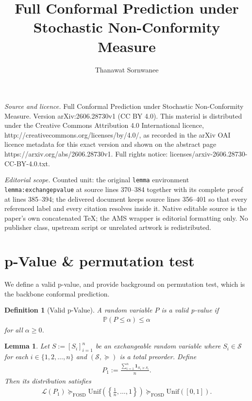 \documentclass[10pt,a4paper]{amsart}
\newcommand{\prob}[1]{\mathbb{P}\left( #1 \right)}
\newcommand{\oo}[1]{\left( #1 \right)}
\newcommand{\cc}[1]{\left[ #1 \right]}
\newtheorem{lemma}{Lemma}
\newtheorem{definition}{Definition}
\begin{document}
\title[Full Conformal Prediction under Stochastic Non-Conformity Me]{Full Conformal Prediction under Stochastic Non-Conformity Measure}
\author{Thanawat Sornwanee}
\date{}
\maketitle
\noindent\emph{Source and licence.} Full Conformal Prediction under Stochastic Non-Conformity Measure. Version arXiv:2606.28730v1 (CC BY 4.0). This material is distributed under the Creative Commons Attribution 4.0 International licence, http://creativecommons.org/licenses/by/4.0/, as recorded in the arXiv OAI licence metadata for this exact version and shown on the abstract page https://arxiv.org/abs/2606.28730v1. Full rights notice: licenses/arxiv-2606.28730-CC-BY-4.0.txt.\par\smallskip
\noindent\textit{Editorial scope.} Counted unit: the original \texttt{lemma} environment \texttt{lemma:exchangepvalue} at source lines 370--384 together with its complete proof at lines 385--394; the delivered document keeps source lines 356--401 so that every referenced label and every citation resolves inside it. Native editable source is the paper's own concatenated TeX; the AMS wrapper is editorial formatting only. No publisher class, upstream script or unrelated artwork is redistributed.
\section{p-Value \& permutation test}
\label{appendix:pperm}

    We define a valid p-value, and provide background on permutation test, which is the backbone conformal prediction.
    
    \begin{definition}
        [Valid p-Value]
        A random variable $P$ is a valid p-value if
        \begin{align*}
            \prob{P \le \alpha} \le \alpha 
        \end{align*}
        for all $\alpha \ge 0$.
    \end{definition}
    

    \begin{lemma}
    \label{lemma:exchangepvalue}
        Let $S:=\cc{S_i}_{i=1}^n$ be an exchangeable random variable where $S_i \in \mathcal{S}$ for each $i \in \{1,2,\dots, n\}$ and $\oo{\mathcal{S}, \succcurlyeq}$ is a total preorder. Define
        \begin{align*}
            P_1 := \frac{\sum_{i=1}^n \mathbf{1}_{S_1 \succcurlyeq S_i}}{n}.
        \end{align*}
        Then its distribution satisfies
        \begin{align*}
            \mathcal{L}(P_1)
            \succcurlyeq_{\mathrm{FOSD}}
            \mathrm{Unif}\!\left(\left\{\frac{1}{n},\ldots,1\right\}\right)
            \succcurlyeq_{\mathrm{FOSD}}
            \mathrm{Unif}([0,1]).
        \end{align*}
    \end{lemma}
\end{document}
